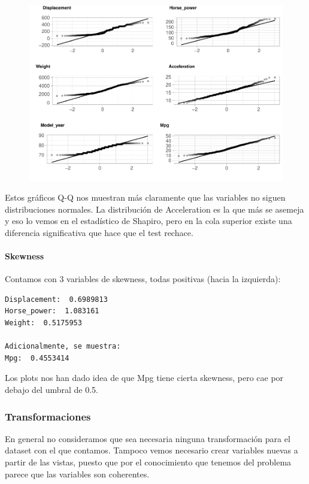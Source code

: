 \begin{figure}[H]\includegraphics[width=.9\linewidth]{img/EDA_files/figure-latex/unnamed-chunk-14-7} \caption{}\end{figure}

Estos gráficos Q-Q nos muestran más claramente que las variables no siguen distribuciones normales. La distribución de Acceleration es la que más se asemeja y eso lo vemos en el estadístico de Shapiro, pero en la cola superior existe una diferencia significativa que hace que el test rechace.

\paragraph{Skewness}
Contamos con 3 variables de skewness, todas positivas (hacia la izquierda):

\begin{verbatim}
Displacement:  0.6989813
Horse_power:  1.083161
Weight:  0.5175953

Adicionalmente, se muestra:
Mpg:  0.4553414
\end{verbatim}

Los plots nos han dado idea de que Mpg tiene cierta skewness, pero cae por debajo del umbral de 0.5.

\subsubsection{Transformaciones}
En general no consideramos que sea necesaria ninguna transformación para el dataset con el que contamos.
Tampoco vemos necesario crear variables nuevas a partir de las vistas, puesto que por el conocimiento que tenemos del problema parece que las variables son coherentes.

